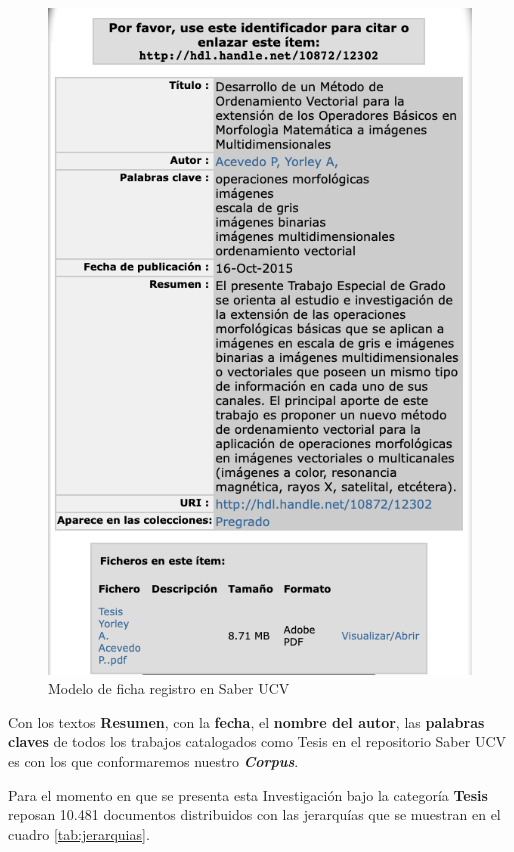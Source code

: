 \documentclass[
  10,
  openany]{book}
\begin{document}
\begin{figure}

{\centering \includegraphics[width=0.6\linewidth]{images/01-intro/ficha_registro} 

}

\caption{Modelo de ficha registro en Saber UCV}\label{fig:ficharegistro}
\end{figure}

Con los textos \textbf{Resumen}, con la \textbf{fecha}, el \textbf{nombre del autor}, las \textbf{palabras claves} de todos los trabajos catalogados como Tesis en el repositorio Saber UCV es con los que conformaremos nuestro \textbf{\emph{Corpus}}.

Para el momento en que se presenta esta Investigación bajo la categoría \textbf{Tesis} reposan 10.481 documentos distribuidos con las jerarquías que se muestran en el cuadro \ref{tab:jerarquias}.

\providecommand{\docline}[3]{\noalign{\global\setlength{\arrayrulewidth}{#1}}\arrayrulecolor[HTML]{#2}\cline{#3}}

\setlength{\tabcolsep}{2pt}

\renewcommand*{\arraystretch}{1.5}
\end{document}
